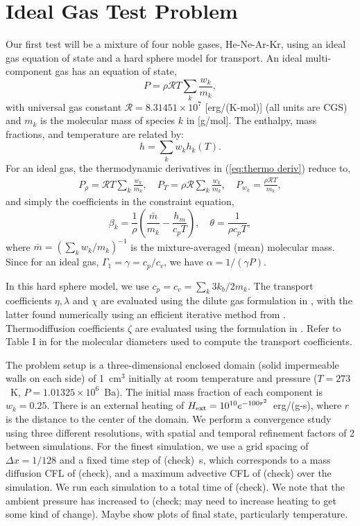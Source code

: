\documentclass[final]{siamltex}
\def\Hext {H_{\rm ext}}
\begin{document}
\section{Ideal Gas Test Problem}
Our first test will be a mixture of four noble gases, He-Ne-Ar-Kr,
using an ideal gas equation of state and a hard sphere model for transport.
An ideal multi-component gas has an equation of state,
\begin{equation}
P = \rho\mathcal{R}T\sum_k\frac{w_k}{m_k},
\end{equation}
with universal gas constant $\mathcal{R} = 8.31451\times 10^7$ [erg/(K-mol)] 
(all units are CGS) and $m_k$ is the molecular mass of species $k$ in [g/mol].
The enthalpy, mass fractions, and temperature are related by:
\begin{equation}
h = \sum_k w_k h_k(T).
\end{equation}
For an ideal gas, the thermodynamic derivatives in (\ref{eq:thermo deriv})
reduce to,
\begin{eqnarray}
P_\rho = \mathcal{R} T\sum_k\frac{w_k}{m_k}, \quad
P_T = \rho\mathcal{R}\sum_k\frac{w_k}{m_k}, \quad
P_{w_k} = \frac{\rho\mathcal{R}T}{m_k},
\end{eqnarray}
and simply the coefficients in the constraint equation,
\begin{equation}
\beta_k = \frac{1}{\rho}\left(\frac{\bar{m}}{m_k} - \frac{h_m}{c_p T}\right), \quad
\theta = \frac{1}{\rho c_p T},
\end{equation}
where $\bar{m} = (\sum_k w_k/m_k)^{-1}$ is the mixture-averaged (mean) molecular mass.  Since for an ideal gas, $\Gamma_1 = \gamma = c_p/c_v$, we have
$\alpha = 1/(\gamma P)$.

In this hard sphere model, we use $c_p = c_v = \sum_k 3k_b/2m_k$.
The transport coefficients $\eta,\lambda$ and $\chi$ are evaluated using the 
dilute gas formulation in \cite{Hirschfelder54}, with the latter found numerically
using an efficient iterative method from \cite{Giovangigli99}.
Thermodiffusion coefficients $\zeta$ are evaluated using the formulation in \cite{Valk}.
Refer to Table I in \cite{LLNS} for the molecular diameters used to compute
the transport coefficients.

The problem setup is a three-dimensional enclosed domain (solid impermeable 
walls on each side) of 1~cm$^3$ initially at room temperature and pressure
($T=273$~K, $P=1.01325\times 10^6$~Ba).  The initial mass fraction of each component
is $w_k = 0.25$.  There is an external heating of $\Hext=10^{10}e^{-100r^2}$~erg/(g-s),
where $r$ is the distance to the center of the domain.  We perform a convergence
study using three different resolutions, with spatial and temporal refinement
factors of 2 between simulations.  For the finest simulation, we use a grid
spacing of $\Delta x = 1/128$ and a fixed time step
of (check)~s, which corresponds to a mass diffusion CFL of (check), and
a maximum advective CFL of (check) over the simulation.
We run each simulation to a total time of (check).
We note that the ambient pressure has increased to (check; may need to increase heating
to get some kind of change).  Maybe show plots of final state, particularly temperature.
\end{document}
